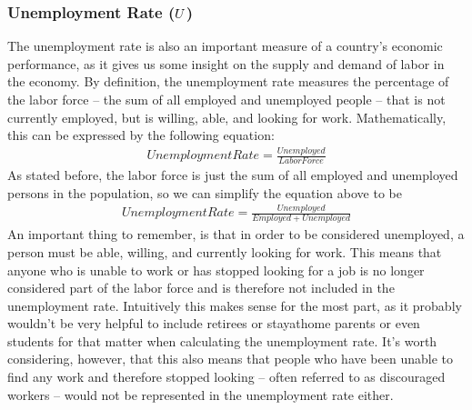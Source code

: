 \documentclass[letterpaper,10pt,english]{jupyterBook}
\begin{document}
\subsubsection{Unemployment Rate (\protect\(U\protect\))}
\label{\detokenize{content/09-macro/MacroChapter:unemployment-rate-u}}
\sphinxAtStartPar
The unemployment rate is also an important measure of a country’s economic performance, as it gives us some insight on the supply and demand of labor in the economy. By definition, the unemployment rate measures the percentage of the labor force – the sum of all employed and unemployed people – that is not currently employed, but is willing, able, and looking for work. Mathematically, this can be expressed by the following equation:
\begin{equation*}
\begin{split}Unemployment Rate = \frac{Unemployed}{Labor Force}\end{split}
\end{equation*}
\sphinxAtStartPar
As stated before, the labor force is just the sum of all employed and unemployed persons in the population, so we can simplify the equation above to be
\begin{equation*}
\begin{split}Unemployment Rate = \frac{Unemployed}{Employed + Unemployed}\end{split}
\end{equation*}
\sphinxAtStartPar
An important thing to remember, is that in order to be considered unemployed, a person must be able, willing, and currently looking for work. This means that anyone who is unable to work or has stopped looking for a job is no longer considered part of the labor force and is therefore not included in the unemployment rate. Intuitively this makes sense for the most part, as it probably wouldn’t be very helpful to include retirees or stay\sphinxhyphen{}at\sphinxhyphen{}home parents or even students for that matter when calculating the unemployment rate. It’s worth considering, however, that this also means that people who have been unable to find any work and therefore stopped looking – often referred to as discouraged workers – would not be represented in the unemployment rate either.
\end{document}
